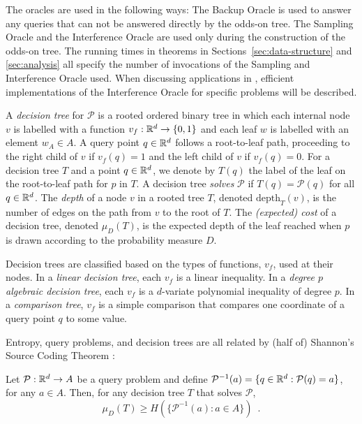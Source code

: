 \documentclass{patmorin}
\newcommand{\depth}{\mathrm{depth}}
\begin{document}
The oracles are used in the following ways:  The Backup Oracle is used to
answer any queries that can not be answered directly by the odds-on tree.
The Sampling Oracle and the Interference Oracle are used only during
the construction of the odds-on tree. The running times in theorems in
Sections~\ref{sec:data-structure} and \ref{sec:analysis} all specify
the number of invocations of the Sampling and Interference Oracle
used. When discussing applications in , efficient
implementations of the Interference Oracle for specific problems will
be described.

A \emph{decision tree} for $\mathcal{P}$ is a rooted ordered binary
tree in which each internal node $v$ is labelled with a function
$v_f:\mathbb{R}^d\rightarrow\{0,1\}$ and each leaf $w$ is labelled with an element
$w_A\in A$.  A query point $q\in\mathbb{R}^d$ follows a root-to-leaf path,
proceeding to the right child of $v$ if $v_f(q)=1$ and the left
child of $v$ if $v_f(q)=0$.  For a decision tree $T$ and a point
$q\in\mathbb{R}^d$, we denote by $T(q)$ the label of the leaf on the root-to-leaf
path for $p$ in $T$.  A decision tree \emph{solves} $\mathcal{P}$ if
$T(q)=\mathcal{P}(q)$ for all $q\in\mathbb{R}^d$. The \emph{depth} of a node $v$
in a rooted tree $T$, denoted $\depth_T(v)$, is the number of edges
on the path from $v$ to the root of $T$.  The \emph{(expected) cost}
of a decision tree, denoted $\mu_D(T)$, is the expected depth of the
leaf reached when $p$ is drawn according to the probability measure $D$.

Decision trees are classified based on the types of functions, $v_f$,
used at their nodes.  In a \emph{linear decision tree}, each $v_f$ is
a linear inequality.  In a \emph{degree $p$ algebraic decision tree},
each $v_f$ is a $d$-variate polynomial inequality of degree $p$.  In a
\emph{comparison tree}, $v_f$ is a simple comparison that compares one
coordinate of a query point $q$ to some value.

Entropy, query problems, and decision trees are all related by (half of)
Shannon's Source Coding Theorem \cite{s48}:

\begin{thm}[Shannon 1948]
  Let $\mathcal{P}:\mathbb{R}^d\rightarrow A$ be a query problem and define
  $\mathcal{P}^{-1}(a)=\{q\in\mathbb{R}^d:\mathcal{P}(q)=a\}$, for any $a\in
  A$. Then, for any decision tree $T$ that solves $\mathcal{P}$,
  \[
    \mu_D(T) \ge H(\{\mathcal{P}^{-1}(a): a\in A\}) \enspace .
  \]
\end{thm}
\end{document}
